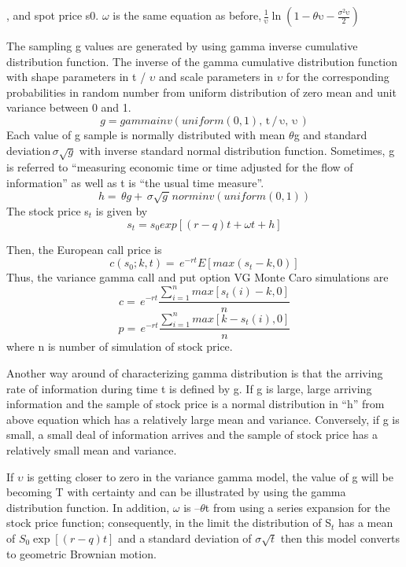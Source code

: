 , and spot price s0. $\omega $ is the same equation as before,$\, 
\frac{1}{\mathrm{\upsilon }}\ln \left( 1-\theta \mathrm{\upsilon 
}-\frac{\sigma^{2}\mathrm{\upsilon }}{2} \right)$

The sampling g values are generated by using gamma inverse cumulative 
distribution function. The inverse of the gamma cumulative distribution 
function with shape parameters in t / $\upsilon $ and scale parameters in 
$\upsilon $ for the corresponding probabilities in random number from 
uniform distribution of zero mean and unit variance between 0 and 1.
\[
g=gammainv(uniform\left( 0,1 \right)\mathrm{,\, t\, /\, \upsilon },\, 
\mathrm{\upsilon }\, )
\]
Each value of g sample is normally distributed with mean $\theta $g and 
standard deviation$\, \sigma \sqrt g $ with inverse standard normal 
distribution function. Sometimes, g is referred to ``measuring economic time 
or time adjusted for the flow of information'' as well as t is ``the usual 
time measure''.
\[
h=\, \theta g+\, \sigma \sqrt {g\, } norminv(uniform\left( 0,1 \right))
\]
The stock price s$_{t}$ is given by
\[
s_{t}=s_{0}exp\left[ \left( r-q \right)t+\omega t+h \right]
\]

Then, the European call price is
\[
c\left( s_{0};k,t \right)=\, e^{-rt}E\left[ max\left( s_{t}-k,0 \right) 
\right]
\]
Thus, the variance gamma call and put option VG Monte Caro simulations are
\[
c=\, e^{-rt}\frac{\sum\limits_{i=1}^n {max\left[ s_{t}\left( i \right)-k,0 
\right]} }{n}
\]
\[
p=\, e^{-rt}\frac{\sum\limits_{i=1}^n {max\left[ {k-s}_{t}\left( i \right),0 
\right]} }{n}
\]
where n is number of simulation of stock price.

Another way around of characterizing gamma distribution is that the arriving 
rate of information during time t is defined by g. If g is large, large 
arriving information and the sample of stock price is a normal distribution 
in ``h'' from above equation which has a relatively large mean and variance. 
Conversely, if g is small, a small deal of information arrives and the 
sample of stock price has a relatively small mean and variance.

If $\upsilon $ is getting closer to zero in the variance gamma model, the 
value of g will be becoming T with certainty and can be illustrated by using 
the gamma distribution function. In addition, $\omega $ is --$\theta $t from 
using a series expansion for the stock price function; consequently, in the 
limit the distribution of S$_{t}$ has a mean of $S_0 \exp[(r-q)t]$ and a 
standard deviation of $\sigma \sqrt{t}$ then this model converts to 
geometric Brownian motion.

